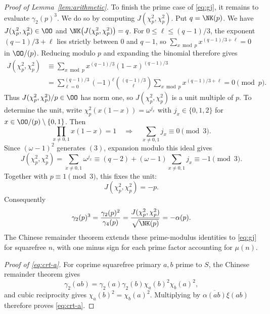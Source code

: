 \begin{proof}[Proof of Lemma~\ref{lem:arithmetic}]
To finish the prime case of \eqref{eq:gj}, it remains to evaluate
$\gamma_2(p)^3$. We do so by computing $J(\chi_p^2,\chi_p^2)$.
Put $q=\NK(p)$. We have $J(\chi_p^2,\chi_p^2)\in\OO$ and $
\NK\bigl(J(\chi_p^2,\chi_p^2)\bigr)=q$.
For $0\le\ell\le(q-1)/3$, the exponent $(q-1)/3+\ell$ lies
strictly between $0$ and $q-1$, so
$\sum_{x\bmod p}x^{(q-1)/3+\ell}=0$ in $\OO/(p)$.
Reducing modulo $p$ and expanding the binomial therefore gives
\[
 \begin{aligned}
 J(\chi_p^2,\chi_p^2)
 &\equiv\sum_{x\bmod p}x^{(q-1)/3}(1-x)^{(q-1)/3}\\
 &=\sum_{\ell=0}^{(q-1)/3}(-1)^\ell\binom{(q-1)/3}{\ell}
       \sum_{x\bmod p}x^{(q-1)/3+\ell}
 =0\pmod p.
 \end{aligned}
\]
 Thus $J(\chi_p^2,\chi_p^2)/p\in\OO$ has norm one,
so $J(\chi_p^2,\chi_p^2)$ is a unit multiple of $p$.
To determine the unit, write
$\chi_p^2(x(1-x))=\omega^{j_x}$ with $j_x\in\{0,1,2\}$
for $x\in\OO/(p)\setminus\{0,1\}$. Then
\[
 \prod_{x\ne0,1}x(1-x)=1
 \quad\Longrightarrow\quad
 \sum_{x\ne0,1}j_x\equiv0\pmod3.
\]
Since $(\omega-1)^2$ generates $(3)$, expansion modulo this ideal gives
\[
 J(\chi_p^2,\chi_p^2) =\sum_{x\ne0,1}\omega^{j_x} \equiv(q-2)+(\omega-1)\sum_{x\ne0,1}j_x \equiv-1\pmod3.
\]
Together with $p\equiv1\pmod3$, this fixes the unit:
\[
 J(\chi_p^2,\chi_p^2)=-p.
\]
Consequently
\[
 \gamma_2(p)^3
 =\frac{\gamma_2(p)^2}{\gamma_4(p)}
 =\frac{J(\chi_p^2,\chi_p^2)}{\sqrt{\NK(p)}}
 =-\alpha(p).
\]
The Chinese remainder theorem extends these prime-modulus identities
to \eqref{eq:gj} for squarefree $n$, with one minus sign for each prime
factor accounting for $\mu(n)$.
\par\noindent\textit{Proof of \eqref{eq:crt-a}.}\quad
For coprime squarefree primary $a,b$ prime to $S$, the Chinese
remainder theorem gives
\[
 \gamma_2(ab)=\gamma_2(a)\gamma_2(b)
                    \chi_a(b)^2\chi_b(a)^2,
\]
and cubic reciprocity gives $\chi_a(b)^2=\chi_b(a)^2$.
Multiplying by $\overline{\alpha(ab)}\xi(ab)$ therefore proves
\eqref{eq:crt-a}.


\end{proof}
